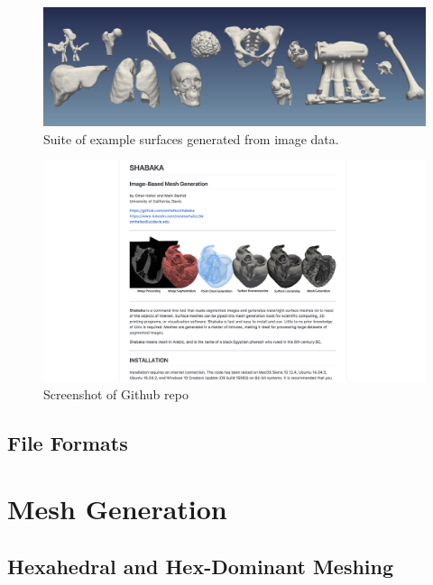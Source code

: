 \begin{figure}[ht!]
\centering
\vspace{2.5mm}
\includegraphics[width=1.0\textwidth]{media/2-shabaka/2-surf/6-showcase.png}
\caption{Suite of example surfaces generated from image data.}
\label{fig:showcase}
\end{figure}

\begin{figure}[ht!]
\centering
\vspace{2.5mm}
\includegraphics[width=1.0\textwidth]{media/2-shabaka/2-surf/7-shabaka.png}
\caption{Screenshot of Github repo}
\label{fig:github}
\end{figure}

\subsection{File Formats}
\label{File Formats-SURF}


\section{Mesh Generation}
%

\subsection{Hexahedral and Hex-Dominant Meshing}
\label{Hexahedral and Hex-Dominant Meshing}

